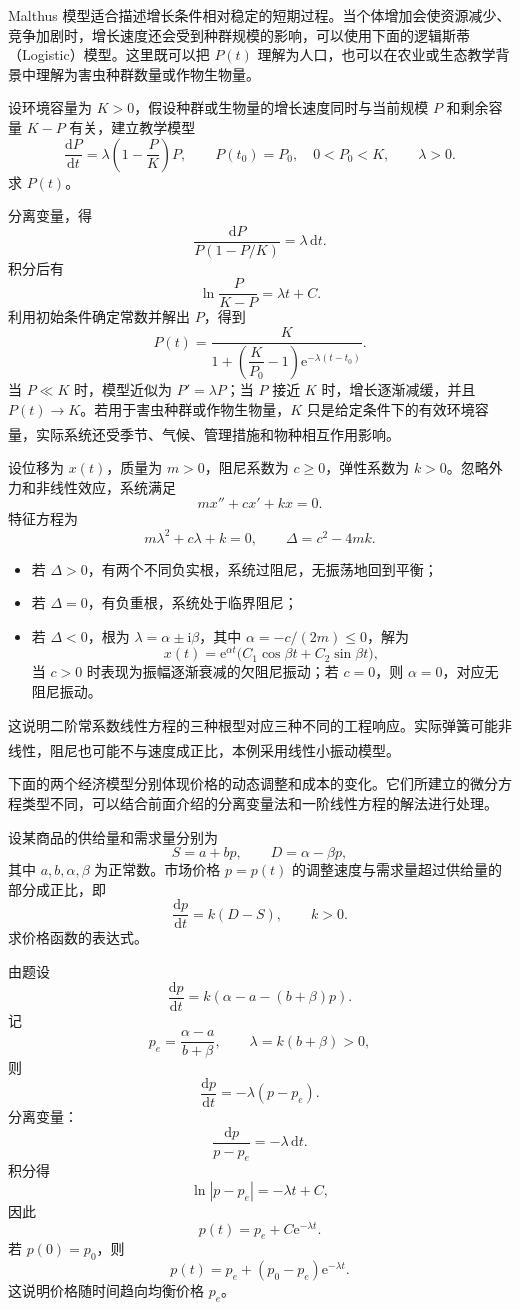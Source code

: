 \documentclass[fontset=fandol]{ctexart}
\newcommand{\dd}{\mathrm{d}}
\newcommand{\ee}{\mathrm{e}}
\newcommand{\ii}{\mathrm{i}}
\newcommand{\upcite}[1]{\textsuperscript{\textsuperscript{\cite{#1}}}}
\begin{document}
Malthus 模型适合描述增长条件相对稳定的短期过程。当个体增加会使资源减少、竞争加剧时，增长速度还会受到种群规模的影响，可以使用下面的逻辑斯蒂（Logistic）模型。这里既可以把 $P(t)$ 理解为人口，也可以在农业或生态教学背景中理解为害虫种群数量或作物生物量。

\begin{example}[逻辑斯蒂生长模型]
设环境容量为 $K>0$，假设种群或生物量的增长速度同时与当前规模 $P$ 和剩余容量 $K-P$ 有关，建立教学模型
\[
\frac{\dd P}{\dd t}=\lambda\left(1-\frac{P}{K}\right)P,
\qquad P(t_0)=P_0,\quad 0<P_0<K,
\qquad \lambda>0.
\]
求 $P(t)$。

分离变量，得
\[
\frac{\dd P}{P\left(1-P/K\right)}=\lambda\,\dd t.
\]
积分后有
\[
\ln\frac{P}{K-P}=\lambda t+C.
\]
利用初始条件确定常数并解出 $P$，得到
\[
P(t)=\frac{K}
{1+\left(\dfrac{K}{P_0}-1\right)\ee^{-\lambda(t-t_0)}}.
\]
当 $P\ll K$ 时，模型近似为 $P'=\lambda P$；当 $P$ 接近 $K$ 时，增长逐渐减缓，并且 $P(t)\to K$。若用于害虫种群或作物生物量，$K$ 只是给定条件下的有效环境容量，实际系统还受季节、气候、管理措施和物种相互作用影响。\upcite{TaizPlant}
\end{example}

\begin{application}
设位移为 $x(t)$，质量为 $m>0$，阻尼系数为 $c\geq0$，弹性系数为 $k>0$。忽略外力和非线性效应，系统满足
\[
mx''+cx'+kx=0.
\]
特征方程为
\[
m\lambda^2+c\lambda+k=0,\qquad \Delta=c^2-4mk.
\]
\begin{itemize}
\item 若 $\Delta>0$，有两个不同负实根，系统过阻尼，无振荡地回到平衡；
\item 若 $\Delta=0$，有负重根，系统处于临界阻尼；
\item 若 $\Delta<0$，根为 $\lambda=\alpha\pm\ii\beta$，其中 $\alpha=-c/(2m)\leq0$，解为
\[
x(t)=\ee^{\alpha t}\bigl(C_1\cos\beta t+C_2\sin\beta t\bigr),
\]
当 $c>0$ 时表现为振幅逐渐衰减的欠阻尼振动；若 $c=0$，则 $\alpha=0$，对应无阻尼振动。
\end{itemize}
这说明二阶常系数线性方程的三种根型对应三种不同的工程响应。实际弹簧可能非线性，阻尼也可能不与速度成正比，本例采用线性小振动模型。\upcite{OpenStaxPhysics1}
\end{application}

下面的两个经济模型分别体现价格的动态调整和成本的变化。它们所建立的微分方程类型不同，可以结合前面介绍的分离变量法和一阶线性方程的解法进行处理。

\begin{example}[价格调整模型]
设某商品的供给量和需求量分别为
\[
S=a+bp,\qquad D=\alpha-\beta p,
\]
其中 $a,b,\alpha,\beta$ 为正常数。市场价格 $p=p(t)$ 的调整速度与需求量超过供给量的部分成正比，即
\[
\frac{\dd p}{\dd t}=k(D-S),\qquad k>0.
\]
求价格函数的表达式。

由题设
\[
\frac{\dd p}{\dd t}=k(\alpha-a-(b+\beta)p).
\]
记
\[
p_e=\frac{\alpha-a}{b+\beta},\qquad \lambda=k(b+\beta)>0,
\]
则
\[
\frac{\dd p}{\dd t}=-\lambda(p-p_e).
\]
分离变量：
\[
\frac{\dd p}{p-p_e}=-\lambda\,\dd t.
\]
积分得
\[
\ln|p-p_e|=-\lambda t+C,
\]
因此
\[
p(t)=p_e+C\ee^{-\lambda t}.
\]
若 $p(0)=p_0$，则
\[
p(t)=p_e+(p_0-p_e)\ee^{-\lambda t}.
\]
这说明价格随时间趋向均衡价格 $p_e$。
\end{example}
\end{document}
